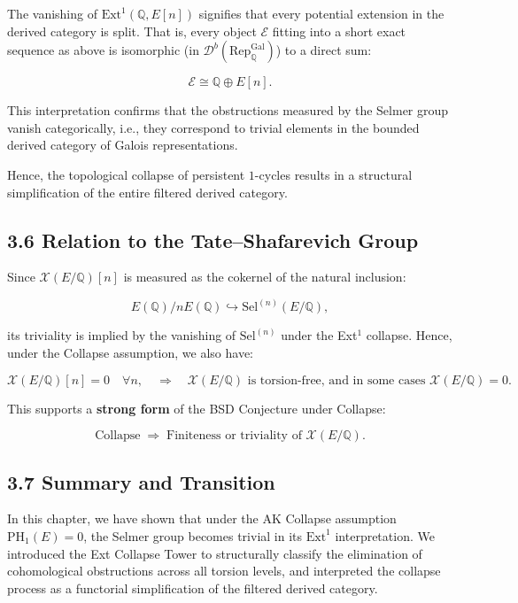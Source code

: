 \documentclass[11pt]{article}
\newcommand{\Sha}{\mathcal{X}}
\begin{document}
The vanishing of $\mathrm{Ext}^1(\mathbb{Q}, E[n])$ signifies that every potential extension in the derived category is split. That is, every object $\mathcal{E}$ fitting into a short exact sequence as above is isomorphic (in $\mathcal{D}^b(\mathrm{Rep}_{\mathbb{Q}}^{\mathrm{Gal}})$) to a direct sum:

\[
\mathcal{E} \cong \mathbb{Q} \oplus E[n].
\]

This interpretation confirms that the obstructions measured by the Selmer group vanish categorically, i.e., they correspond to trivial elements in the bounded derived category of Galois representations.

Hence, the topological collapse of persistent $1$-cycles results in a structural simplification of the entire filtered derived category.

\subsection{3.6 Relation to the Tate–Shafarevich Group}

Since $\Sha(E/\mathbb{Q})[n]$ is measured as the cokernel of the natural inclusion:

\[
E(\mathbb{Q})/nE(\mathbb{Q}) \hookrightarrow \mathrm{Sel}^{(n)}(E/\mathbb{Q}),
\]

its triviality is implied by the vanishing of $\mathrm{Sel}^{(n)}$ under the Ext$^1$ collapse.  
Hence, under the Collapse assumption, we also have:

\[
\Sha(E/\mathbb{Q})[n] = 0 \quad \forall n,
\quad \Rightarrow \quad \Sha(E/\mathbb{Q}) \text{ is torsion-free, and in some cases } \Sha(E/\mathbb{Q}) = 0.
\]

This supports a \textbf{strong form} of the BSD Conjecture under Collapse:

\[
\text{Collapse} \;\Rightarrow\; \text{Finiteness or triviality of } \Sha(E/\mathbb{Q}).
\]

\subsection{3.7 Summary and Transition}

In this chapter, we have shown that under the AK Collapse assumption $\mathrm{PH}_1(E)=0$, the Selmer group becomes trivial in its $\mathrm{Ext}^1$ interpretation.  
We introduced the Ext Collapse Tower to structurally classify the elimination of cohomological obstructions across all torsion levels, and interpreted the collapse process as a functorial simplification of the filtered derived category.
\end{document}
